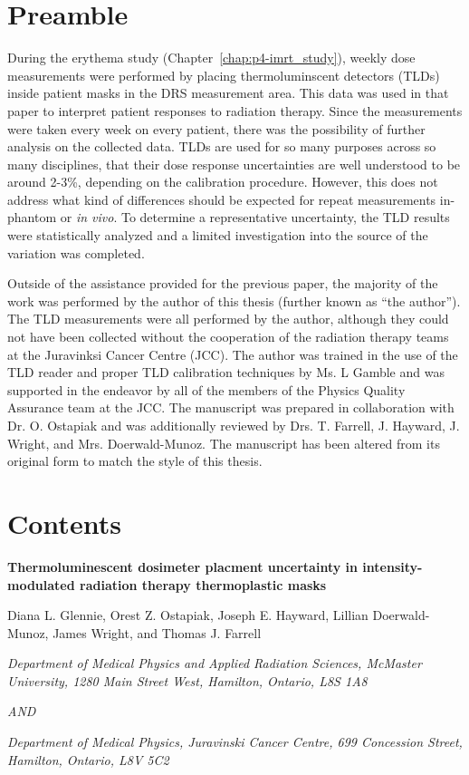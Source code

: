 \label{chap:p5-tlds}
\section*{Preamble}
During the erythema study (Chapter~\ref{chap:p4-imrt_study}), weekly dose measurements were performed by placing thermoluminscent detectors (TLDs) inside patient masks in the DRS measurement area. This data was used in that paper to interpret patient responses to radiation therapy. Since the measurements were taken every week on every patient, there was the possibility of further analysis on the collected data. TLDs are used for so many purposes across so many disciplines, that their dose response uncertainties are well understood to be around 2-3\%, depending on the calibration procedure. However, this does not address what kind of differences should be expected for repeat measurements in-phantom or \emph{in vivo}. To determine a representative uncertainty, the TLD results were statistically analyzed and a limited investigation into the source of the variation was completed.

Outside of the assistance provided for the previous paper, the majority of the work was performed by the author of this thesis (further known as ``the author''). The TLD measurements were all performed by the author, although they could not have been collected without the cooperation of the radiation therapy teams at the Juravinksi Cancer Centre (JCC). The author was trained in the use of the TLD reader and proper TLD calibration techniques by Ms. L Gamble and was supported in the endeavor by all of the members of the Physics Quality Assurance team at the JCC. The manuscript was prepared in collaboration with Dr. O. Ostapiak and was additionally reviewed by Drs. T. Farrell, J. Hayward, J. Wright, and Mrs. Doerwald-Munoz. The manuscript has been altered from its original form to match the style of this thesis.

\section*{Contents}

\begin{center}
	
	\textbf{Thermoluminescent dosimeter placment uncertainty in intensity-modulated radiation therapy thermoplastic masks}
	
	Diana L. Glennie, Orest Z. Ostapiak, Joseph E. Hayward, Lillian Doerwald-Munoz, James Wright, and Thomas J. Farrell
	
	\textit{Department of Medical Physics and Applied Radiation Sciences, McMaster University, 1280 Main Street West, Hamilton, Ontario, L8S 1A8}
	
	\textit{AND}
	
	\textit{Department of Medical Physics, Juravinski Cancer Centre, 699 Concession Street, Hamilton, Ontario, L8V 5C2}
	
\end{center}

